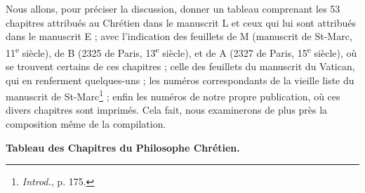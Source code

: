 \documentclass[a4paper, 11pt, oneside, polutonikogreek, french]{article}
\begin{document}
Nous allons, pour préciser la discussion, donner un tableau comprenant les 53 chapitres attribués au Chrétien dans le manuscrit L et ceux qui lui sont attribués dans le manuscrit E ; avec l'indication des feuillets de M (manuscrit de St-Marc, 11\textsuperscript{e} siècle), de B (2325 de Paris, 13\textsuperscript{e} siècle), et de A (2327 de Paris, 15\textsuperscript{e} siècle), où se trouvent certains de ces chapitres ; celle des feuillets du manuscrit du Vatican, qui en renferment quelques-uns ; les numéros correspondants de la vieille liste du manuscrit de St-Marc\footnote{\emph{Introd.}, p. 175.} ; enfin les numéros de notre propre publication, où ces divers chapitres sont imprimés. Cela fait, nous examinerons de plus près la composition même de la compilation.
\begin{center}
\textbf{Tableau des Chapitres du Philosophe Chrétien.}
\end{center}
\end{document}
